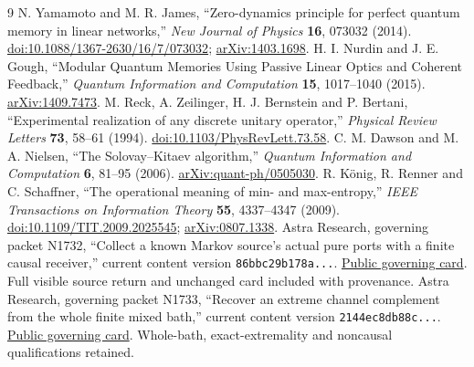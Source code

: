 \documentclass[11pt,a4paper]{article}
\begin{document}
\begin{thebibliography}{9}
 N. Yamamoto and M. R. James, ``Zero-dynamics principle for perfect quantum memory in linear networks,'' \emph{New Journal of Physics} \textbf{16}, 073032 (2014). \href{https://doi.org/10.1088/1367-2630/16/7/073032}{doi:10.1088/1367-2630/16/7/073032}; \href{https://arxiv.org/abs/1403.1698}{arXiv:1403.1698}.
 H. I. Nurdin and J. E. Gough, ``Modular Quantum Memories Using Passive Linear Optics and Coherent Feedback,'' \emph{Quantum Information and Computation} \textbf{15}, 1017--1040 (2015). \href{https://arxiv.org/abs/1409.7473}{arXiv:1409.7473}.
 M. Reck, A. Zeilinger, H. J. Bernstein and P. Bertani, ``Experimental realization of any discrete unitary operator,'' \emph{Physical Review Letters} \textbf{73}, 58--61 (1994). \href{https://doi.org/10.1103/PhysRevLett.73.58}{doi:10.1103/PhysRevLett.73.58}.
 C. M. Dawson and M. A. Nielsen, ``The Solovay--Kitaev algorithm,'' \emph{Quantum Information and Computation} \textbf{6}, 81--95 (2006). \href{https://arxiv.org/abs/quant-ph/0505030}{arXiv:quant-ph/0505030}.
 R. K\"onig, R. Renner and C. Schaffner, ``The operational meaning of min- and max-entropy,'' \emph{IEEE Transactions on Information Theory} \textbf{55}, 4337--4347 (2009). \href{https://doi.org/10.1109/TIT.2009.2025545}{doi:10.1109/TIT.2009.2025545}; \href{https://arxiv.org/abs/0807.1338}{arXiv:0807.1338}.
 Astra Research, governing packet N1732, ``Collect a known Markov source's actual pure ports with a finite causal receiver,'' current content version \texttt{86bbc29b178a...}. \href{https://github.com/harjassand/astra-research-knowledge/blob/main/knowledge/current/packets/N1732.json}{Public governing card}. Full visible source return and unchanged card included with provenance.
 Astra Research, governing packet N1733, ``Recover an extreme channel complement from the whole finite mixed bath,'' current content version \texttt{2144ec8db88c...}. \href{https://github.com/harjassand/astra-research-knowledge/blob/main/knowledge/current/packets/N1733.json}{Public governing card}. Whole-bath, exact-extremality and noncausal qualifications retained.
\end{thebibliography}
\end{document}
